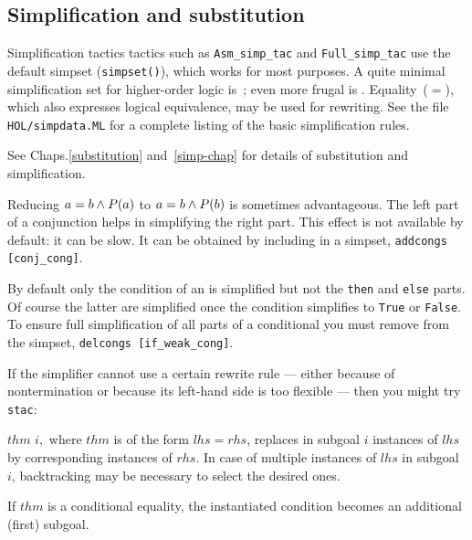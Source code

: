\subsection{Simplification and substitution}

Simplification tactics tactics such as \texttt{Asm_simp_tac} and \texttt{Full_simp_tac} use the default simpset
(\texttt{simpset()}), which works for most purposes.  A quite minimal
simplification set for higher-order logic is~;
even more frugal is .  Equality~($=$), which
also expresses logical equivalence, may be used for rewriting.  See
the file \texttt{HOL/simpdata.ML} for a complete listing of the basic
simplification rules.

See %
{Chaps.\ts\ref{substitution} and~\ref{simp-chap}} for details of substitution
and simplification.

\begin{warn}%
  Reducing $a=b\wedge P(a)$ to $a=b\wedge P(b)$ is sometimes advantageous.  The
  left part of a conjunction helps in simplifying the right part.  This effect
  is not available by default: it can be slow.  It can be obtained by
  including  in a simpset, \verb$addcongs [conj_cong]$.
\end{warn}

\begin{warn}\label{if-simp}%
  By default only the condition of an  is simplified but not the
  \texttt{then} and \texttt{else} parts. Of course the latter are simplified
  once the condition simplifies to \texttt{True} or \texttt{False}. To ensure
  full simplification of all parts of a conditional you must remove
   from the simpset, \verb$delcongs [if_weak_cong]$.
\end{warn}

If the simplifier cannot use a certain rewrite rule --- either because
of nontermination or because its left-hand side is too flexible ---
then you might try \texttt{stac}:
\begin{ttdescription}
\item[\ttindexbold{stac} $thm$ $i,$] where $thm$ is of the form $lhs = rhs$,
  replaces in subgoal $i$ instances of $lhs$ by corresponding instances of
  $rhs$.  In case of multiple instances of $lhs$ in subgoal $i$, backtracking
  may be necessary to select the desired ones.

If $thm$ is a conditional equality, the instantiated condition becomes an
additional (first) subgoal.
\end{ttdescription}

